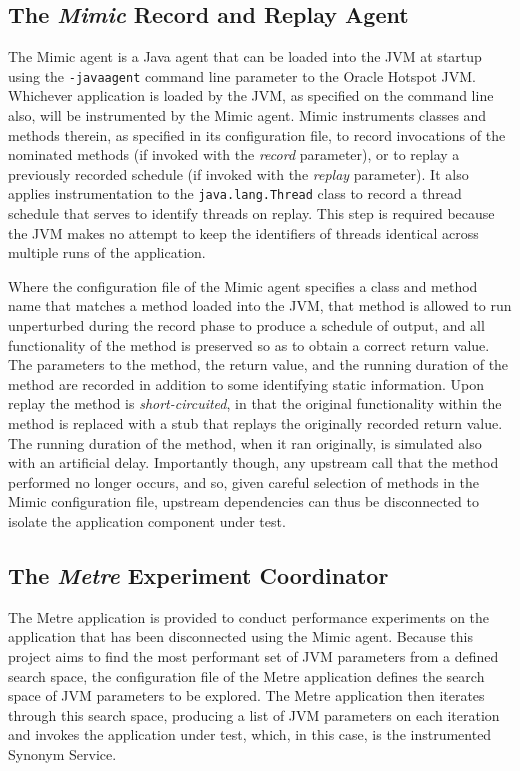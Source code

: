 \documentclass[]{final_report}
\begin{document}
\subsection*{The \textit{Mimic} Record and Replay Agent}
The Mimic agent is a Java agent that can be loaded into the JVM at startup using the \lstinline{-javaagent}\noop{} command line parameter to the Oracle Hotspot JVM\cite{java:2016}. Whichever application is loaded by the JVM, as specified on the command line also, will be instrumented by the Mimic agent. Mimic instruments classes and methods therein, as specified in its configuration file, to record invocations of the nominated methods (if invoked with the \textit{record} parameter), or to replay a previously recorded schedule (if invoked with the \textit{replay} parameter). It also applies instrumentation to the \lstinline{java.lang.Thread}\noop{} class to record a thread schedule that serves to identify threads on replay. This step is required because the JVM makes no attempt to keep the identifiers of threads identical across multiple runs of the application.

Where the configuration file of the Mimic agent specifies a class and method name that matches a method loaded into the JVM, that method is allowed to run unperturbed during the record phase to produce a schedule of output, and all functionality of the method is preserved so as to obtain a correct return value. The parameters to the method, the return value, and the running duration of the method are recorded in addition to some identifying static information. Upon replay the method is \textit{short-circuited}, in that the original functionality within the method is replaced with a stub that replays the originally recorded return value. The running duration of the method, when it ran originally, is simulated also with an artificial delay. Importantly though, any upstream call that the method performed no longer occurs, and so, given careful selection of methods in the Mimic configuration file, upstream dependencies can thus be disconnected to isolate the application component under test.

\subsection*{The \textit{Metre} Experiment Coordinator}
The Metre application is provided to conduct performance experiments on the application that has been disconnected using the Mimic agent. Because this project aims to find the most performant  set of JVM parameters from a defined search space, the configuration file of the Metre application defines the search space of JVM parameters to be explored. The Metre application then iterates through this search space, producing a list of JVM parameters on each iteration and invokes the application under test, which, in this case, is the instrumented Synonym Service.
\end{document}
